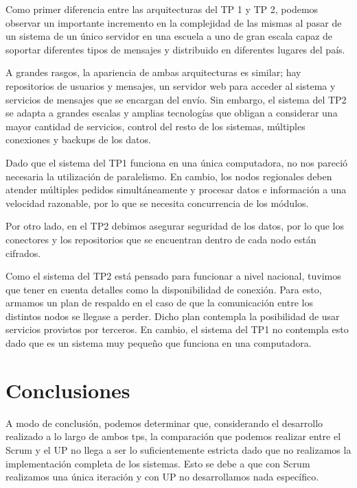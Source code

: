 \documentclass[a4paper, 10pt, twoside]{article}
\begin{document}
Como primer diferencia entre las arquitecturas del TP 1 y TP 2, podemos observar un importante incremento en la complejidad de las mismas al pasar de un sistema de un único servidor en una escuela a uno de gran escala capaz de soportar diferentes tipos de mensajes y distribuido en diferentes lugares del país.

A grandes rasgos, la apariencia de ambas arquitecturas es similar; hay repositorios de usuarios y mensajes, un servidor web para acceder al sistema y servicios de mensajes que se encargan del envío. Sin embargo, el sistema del TP2 se adapta a grandes escalas y amplias tecnologías que obligan a considerar una mayor cantidad de servicios, control del resto de los sistemas, múltiples conexiones y backups de los datos.

Dado que el sistema del TP1 funciona en una única computadora, no nos pareció necesaria la utilización de paralelismo. En cambio, los nodos regionales deben atender múltiples pedidos simultáneamente y procesar datos e información a una velocidad razonable, por lo que se necesita concurrencia de los módulos. 

Por otro lado, en el TP2 debimos asegurar seguridad de los datos, por lo que los conectores y los repositorios que se encuentran dentro de cada nodo están cifrados.

Como el sistema del TP2 está pensado para funcionar a nivel nacional, tuvimos que tener en cuenta detalles como la disponibilidad de conexión. Para esto, armamos un plan de respaldo en el caso de que la comunicación entre los distintos nodos se llegase a perder. Dicho plan contempla la posibilidad de usar servicios provistos por terceros. En cambio, el sistema del TP1 no contempla esto dado que es un sistema muy pequeño que funciona en una computadora.

\newpage




\section{Conclusiones}

A modo de conclusión, podemos determinar que, considerando el desarrollo realizado a lo largo de ambos tps, la comparación que podemos realizar entre el Scrum y el UP no llega a ser lo suficientemente estricta dado que no realizamos la implementación completa de los sistemas. Esto se debe a que con Scrum realizamos una única iteración y con UP no desarrollamos nada específico.
\end{document}
